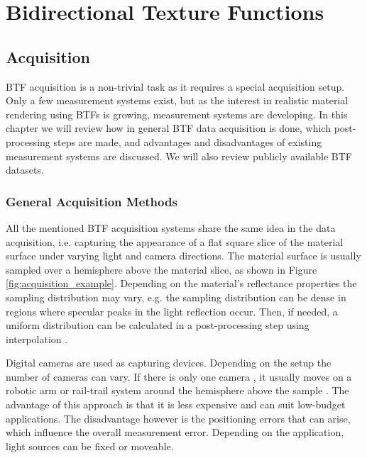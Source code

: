\chapter{Bidirectional Texture Functions}
\label{chapter:stateOfArt}


\section{Acquisition}
\label{chapter:acquisition}

BTF acquisition is a non-trivial task as it requires a special acquisition setup. 
Only a few measurement systems \cite{star2004,schwartz,dana,Kaleidoscope,Koudelka,statistical_acq} exist, but as the interest in realistic material rendering using BTFs is growing, measurement systems are developing.
In this chapter we will review how in general BTF data acquisition is done, which post-processing steps are made, and advantages and disadvantages of existing measurement systems are discussed. 
We will also review publicly available BTF datasets.

\subsection{General Acquisition Methods}
\label{section:General_acquisition}	
All the mentioned BTF acquisition systems share the same idea in the data acquisition, i.e. capturing the appearance of a flat square slice of the material surface under varying light and camera directions.
The material surface is usually sampled over a hemisphere above the material slice, as shown in Figure \ref{fig:acquisition_example}.
Depending on the material's reflectance properties the sampling distribution may vary, e.g. the sampling distribution can be dense in regions where specular peaks in the light reflection occur. 
Then, if needed, a uniform distribution can be calculated in a post-processing step using interpolation \cite{haindl_visual}.

Digital cameras are used as capturing devices. Depending on the setup the number of cameras can vary.
 If there is only one camera \cite{star2004,statistical_acq,dana}, it usually moves on a robotic arm or rail-trail system around the hemisphere above the sample \cite{star2004}. 
 The advantage of this approach is that it is less expensive and can suit low-budget applications.
The disadvantage however is the positioning errors that can arise, which influence the overall measurement error. 
Depending on the application, light sources can be fixed or moveable.


